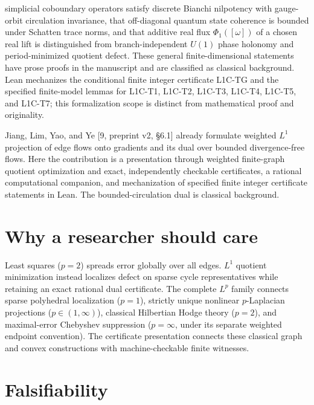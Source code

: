 \documentclass[
]{article}
\begin{document}
simplicial coboundary operators satisfy discrete Bianchi nilpotency with
gauge-orbit circulation invariance, that off-diagonal quantum state coherence is bounded under Schatten trace norms, and that additive real flux \(\Phi_1([\omega])\) of a chosen real lift is distinguished from branch-independent \(U(1)\) phase holonomy and period-minimized quotient defect. These general finite-dimensional statements have prose proofs in the manuscript and are classified as classical background. Lean mechanizes the conditional finite integer certificate L1C-TG and the specified finite-model lemmas for L1C-T1, L1C-T2, L1C-T3, L1C-T4, L1C-T5, and L1C-T7; this formalization scope is distinct from mathematical proof and originality.

Jiang, Lim, Yao, and Ye {[}9, preprint v2, §6.1{]} already formulate weighted \(L^1\) projection of edge flows onto gradients and its dual over bounded divergence-free flows. Here the contribution is a presentation through weighted finite-graph quotient optimization and exact, independently checkable certificates, a rational computational companion, and mechanization of specified finite integer certificate statements in Lean. The bounded-circulation dual is classical background.

\section*{Why a researcher should care}\label{why-a-researcher-should-care}

Least squares (\(p=2\)) spreads error globally over all edges. \(L^1\) quotient
minimization instead localizes defect on sparse cycle representatives while
retaining an exact rational dual certificate. The complete \(L^p\) family connects
sparse polyhedral localization (\(p=1\)), strictly unique nonlinear
\(p\)-Laplacian projections (\(p \in (1, \infty)\)), classical Hilbertian Hodge theory
(\(p=2\)), and maximal-error Chebyshev suppression (\(p=\infty\), under its separate weighted endpoint convention). The certificate presentation connects these classical graph and convex constructions with machine-checkable finite witnesses.

\section*{Falsifiability}\label{falsifiability}
\end{document}
